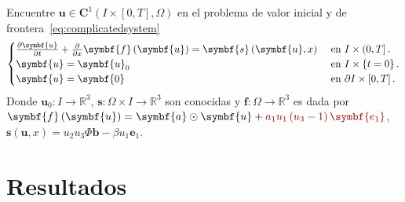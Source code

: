 Encuentre
\begin{math}
	\symbf{u}\in
	\symbf{C}^{1}\left(I\times\left[0,T\right],\Omega\right)
\end{math}
en el problema de valor inicial y de frontera~\eqref{eq:complicatedsystem}
\begin{equation}\label{eq:complicatedsystem}
	\begin{cases}
		\diffp{\symbf{u}}{t}+\diffp{}{x}\symbf{f}\left(\symbf{u}\right)=
		\symbf{s}\left(\symbf{u},x\right) & \text{ en }I\times\left(0,T\right].          \\
		\symbf{u}                                                      =
		\symbf{u}_{0}                     & \text{ en }I\times\left\{t=0\right\}.        \\
		\symbf{u}                                                       =
		\symbf{0}                         & \text{ en }\partial I\times\left[0,T\right].
	\end{cases}
\end{equation}
Donde
\begin{math}
	\symbf{u}_{0}\colon I\to
	\mathbb{R}^{3}
\end{math},
\begin{math}
	\symbf{s}\colon \Omega\times I\to
	\mathbb{R}^{3}
\end{math}
son conocidas y
\begin{math}
	\symbf{f}\colon\Omega\to
	\mathbb{R}^{3}
\end{math}
es dada por
\begin{math}
	\symbf{f}\left(\symbf{u}\right)=
	\symbf{a}\odot\symbf{u}+
	\mathcolor{DarkRed}{a_{1}u_{1}\left(u_{3}-1\right)\symbf{e_{1}}}
\end{math},
\begin{math}
	\symbf{s}\left(\symbf{u},x\right)=
	u_{2}u_{3}\Phi\symbf{b}-\beta u_{1}\symbf{e}_{1}
\end{math}.

\chapter{Resultados}


